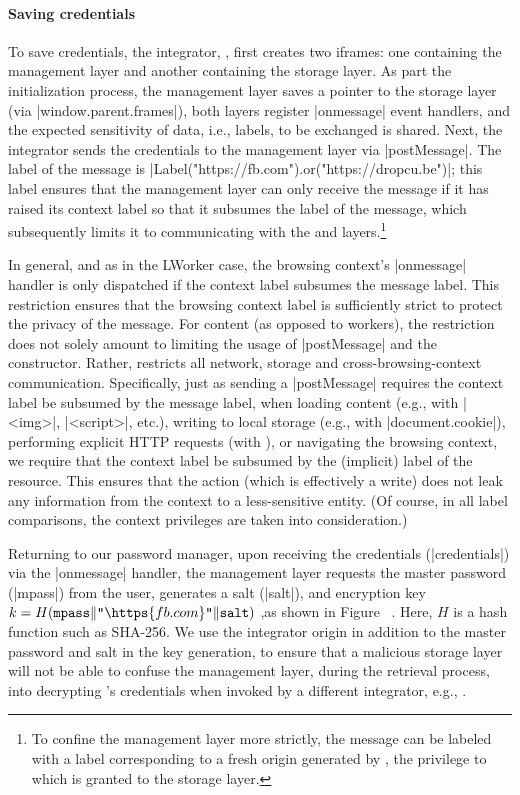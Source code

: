 \paragraph{Saving credentials}
%
To save credentials, the integrator, , first creates two
iframes: one containing the  management layer and
another containing the  storage layer.
%
As part the initialization process, the management layer saves a
pointer to the storage layer (via \js|window.parent.frames|), both
layers register \js|onmessage| event handlers, and the expected
sensitivity of data, i.e., labels, to be exchanged is shared.
%
Next, the integrator sends the credentials to the management
layer via \js|postMessage|.
%
The label of the message is
\js|Label("https://fb.com").or("https://dropcu.be")|; this label
ensures that the management layer can only receive the message if it
has raised its context label so that it subsumes the label of the
message, which subsequently limits it to communicating with the
 and  layers.\footnote{
  To confine the management layer more strictly, the message can be
  labeled with a label corresponding to a fresh origin generated by
  , the privilege to which is granted to the storage
  layer. 
}

In general, and as in the LWorker case, the browsing context's
\js|onmessage| handler is only dispatched if the context label
subsumes the message label.
%
This restriction ensures that the browsing context label is
sufficiently strict to protect the privacy of the message.
%
For content (as opposed to workers), the restriction does not solely
amount to limiting the usage of \js|postMessage| and the \xhr{}
constructor.
%
Rather, \sys{} restricts all network, storage and
cross-browsing-context communication.
%
Specifically, just as sending a \js|postMessage| requires the context
label be subsumed by the message label, when loading content (e.g.,
with \js|<img>|, \js|<script>|, etc.), writing to local storage (e.g.,
with \js|document.cookie|), performing explicit HTTP requests (with
\xhr{}), or navigating the browsing context, we require that the
context label be subsumed by the (implicit) label of the resource.
%
This ensures that the action (which is effectively a write) does not
leak any information from the context to a less-sensitive entity.
%
(Of course, in all label comparisons, the context privileges are taken
into consideration.)
%
 
Returning to our password manager, upon receiving the credentials
(\js|credentials|) via the \js|onmessage| handler, the management
layer requests the master password (\js|mpass|) from the user, 
generates a salt (\js|salt|), and encryption key $k =
H(\texttt{mpass}\|\texttt{"}\https{fb.com}\texttt{"}\|\texttt{salt})$
\iffigures
\ifcompletefigures
,as shown in Figure~
\fi
\fi
.
%
Here, $H$ is a hash function such as SHA-256.
%
We use the integrator origin in addition to the master password and
salt in the key generation, to ensure that a malicious storage layer
will not be able to confuse the management layer, during the retrieval
process, into decrypting 's credentials when invoked by
a different integrator, e.g., .

